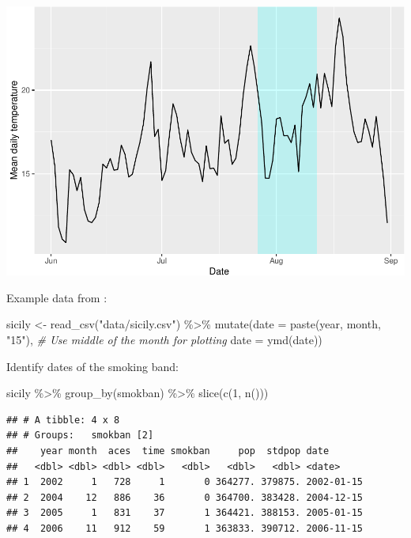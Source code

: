 \documentclass[
]{book}
\newenvironment{Shaded}{\begin{snugshade}}{\end{snugshade}}
\newcommand{\AttributeTok}[1]{\textcolor[rgb]{0.77,0.63,0.00}{#1}}
\newcommand{\CommentTok}[1]{\textcolor[rgb]{0.56,0.35,0.01}{\textit{#1}}}
\newcommand{\DecValTok}[1]{\textcolor[rgb]{0.00,0.00,0.81}{#1}}
\newcommand{\FunctionTok}[1]{\textcolor[rgb]{0.00,0.00,0.00}{#1}}
\newcommand{\NormalTok}[1]{#1}
\newcommand{\OtherTok}[1]{\textcolor[rgb]{0.56,0.35,0.01}{#1}}
\newcommand{\SpecialCharTok}[1]{\textcolor[rgb]{0.00,0.00,0.00}{#1}}
\newcommand{\StringTok}[1]{\textcolor[rgb]{0.31,0.60,0.02}{#1}}
\begin{document}
\includegraphics{adv_epi_analysis_files/figure-latex/unnamed-chunk-108-1.pdf}

Example data from \citet{bernal2017interrupted}:

\begin{Shaded}
\begin{Highlighting}[]
\NormalTok{sicily }\OtherTok{\textless{}{-}} \FunctionTok{read\_csv}\NormalTok{(}\StringTok{"data/sicily.csv"}\NormalTok{) }\SpecialCharTok{\%\textgreater{}\%} 
  \FunctionTok{mutate}\NormalTok{(}\AttributeTok{date =} \FunctionTok{paste}\NormalTok{(year, month, }\StringTok{"15"}\NormalTok{), }\CommentTok{\# Use middle of the month for plotting}
         \AttributeTok{date =} \FunctionTok{ymd}\NormalTok{(date))}
\end{Highlighting}
\end{Shaded}

Identify dates of the smoking band:

\begin{Shaded}
\begin{Highlighting}[]
\NormalTok{sicily }\SpecialCharTok{\%\textgreater{}\%} 
  \FunctionTok{group\_by}\NormalTok{(smokban) }\SpecialCharTok{\%\textgreater{}\%} 
  \FunctionTok{slice}\NormalTok{(}\FunctionTok{c}\NormalTok{(}\DecValTok{1}\NormalTok{, }\FunctionTok{n}\NormalTok{()))}
\end{Highlighting}
\end{Shaded}

\begin{verbatim}
## # A tibble: 4 x 8
## # Groups:   smokban [2]
##    year month  aces  time smokban     pop  stdpop date      
##   <dbl> <dbl> <dbl> <dbl>   <dbl>   <dbl>   <dbl> <date>    
## 1  2002     1   728     1       0 364277. 379875. 2002-01-15
## 2  2004    12   886    36       0 364700. 383428. 2004-12-15
## 3  2005     1   831    37       1 364421. 388153. 2005-01-15
## 4  2006    11   912    59       1 363833. 390712. 2006-11-15
\end{verbatim}
\end{document}
